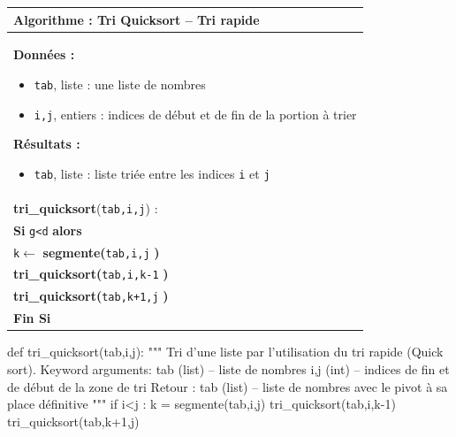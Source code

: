 \documentclass[10pt,fleqn]{article} %
\newcommand{\tsf}[1]{\small{\texttt{#1}}}
\begin{document}
\begin{minipage}[c]{.48\linewidth}
\begin{pseudo}
\begin{tabular}{p{.9\linewidth}}
\hline
\textbf{Algorithme :} Tri Quicksort -- Tri rapide\\
\hline
\textbf{Données :}
\begin{itemize}
\item \tsf{tab}, liste : une liste de nombres
\item \tsf{i,j}, entiers : indices de début et de fin de la portion à trier
\end{itemize}
\textbf{Résultats :} 
\begin{itemize}
\item \tsf{tab}, liste : liste triée entre les indices \tsf{i} et \tsf{j}
\end{itemize}
\\
\textbf{tri\_quicksort}(\tsf{tab,i,j}) :\\
\hspace{.4cm} \textbf{Si} \tsf{g<d} \textbf{alors} \\
\hspace{.8cm} \tsf{k$\leftarrow$} \textbf{segmente(}\tsf{tab,i,j} \textbf{)} \\
\hspace{.8cm} \textbf{tri\_quicksort(}\tsf{tab,i,k-1} \textbf{)} \\
\hspace{.8cm} \textbf{tri\_quicksort(}\tsf{tab,k+1,j} \textbf{)} \\
\hspace{.4cm} \textbf{Fin Si} \\
\hline
\end{tabular}
\end{pseudo}
\end{minipage}\hfill
\begin{minipage}[c]{.48\linewidth} 
\begin{py}
\begin{python}
def tri_quicksort(tab,i,j):
    """
    Tri d'une liste par l'utilisation du 
    tri rapide (Quick sort).
    Keyword arguments: 
    tab (list) -- liste de nombres
    i,j (int) -- indices de fin et de 
    début de la zone de tri
    Retour :    
    tab (list) -- liste de nombres avec 
    le pivot à sa place définitive
    """
    if i<j :
        k = segmente(tab,i,j)
        tri_quicksort(tab,i,k-1)
        tri_quicksort(tab,k+1,j)
\end{python}
\end{py}
\end{minipage}
\end{document}

